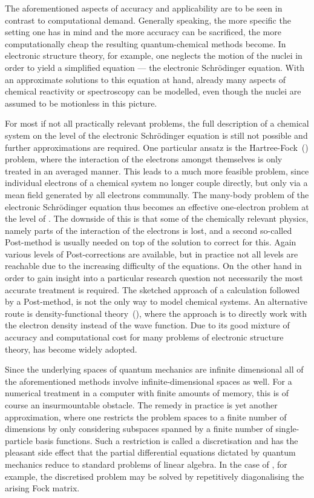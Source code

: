 The aforementioned aspects of accuracy and applicability
are to be seen in contrast to computational demand.
Generally speaking, the more specific the setting one has in mind
and the more accuracy can be sacrificed,
the more computationally cheap the resulting quantum-chemical methods become.
In electronic structure theory, for example,
one neglects the motion of the nuclei
in order to yield a simplified equation --- the electronic Schrödinger equation.
With an approximate solutions to this equation
at hand, already many aspects of chemical reactivity or spectroscopy
can be modelled, even though the nuclei are assumed to be motionless in this picture.

For most if not all practically relevant problems,
the full description of a chemical system
on the level of the electronic Schrödinger equation is still not possible
and further approximations are required.
One particular ansatz is the Hartree-Fock~(\HF) problem,
where the interaction of the electrons amongst themselves
is only treated in an averaged manner.
This leads to a much more feasible problem,
since individual electrons of a chemical system no longer couple directly,
but only via a mean field generated by all electrons communally.
The many-body problem of the electronic Schrödinger equation
thus becomes an effective one-electron problem at the level of \HF.
The downside of this is that some of the chemically relevant physics,
namely parts of the interaction of the electrons is lost,
and a second so-called Post-\HF method is usually needed
on top of the \HF solution to correct for this.
Again various levels of Post-\HF corrections are available,
but in practice not all levels are reachable due to the
increasing difficulty of the equations.
On the other hand in order to gain insight
into a particular research question
not necessarily the most accurate treatment is required.
The sketched approach of a \HF calculation followed by a Post-\HF method,
is not the only way to model chemical systems.
An alternative route is density-functional theory~(\DFT),
where the approach is to directly work with the electron density
instead of the wave function.
Due to its good mixture of accuracy and computational cost
for many problems of electronic structure theory,
\DFT has become widely adopted.

Since the underlying spaces of quantum mechanics are infinite dimensional
all of the aforementioned methods
involve infinite-dimensional spaces as well.
For a numerical treatment in a computer with finite amounts of memory,
this is of course an insurmountable obstacle.
The remedy in practice is yet another approximation,
where one restricts the problem spaces
to a finite number of dimensions by only considering subspaces
spanned by a finite number of single-particle basis functions.
Such a restriction is called a discretisation
and has the pleasant side effect that the partial differential equations
dictated by quantum mechanics
reduce to standard problems of linear algebra.
In the case of \HF, for example,
the discretised problem may be solved by repetitively diagonalising
the arising Fock matrix.

